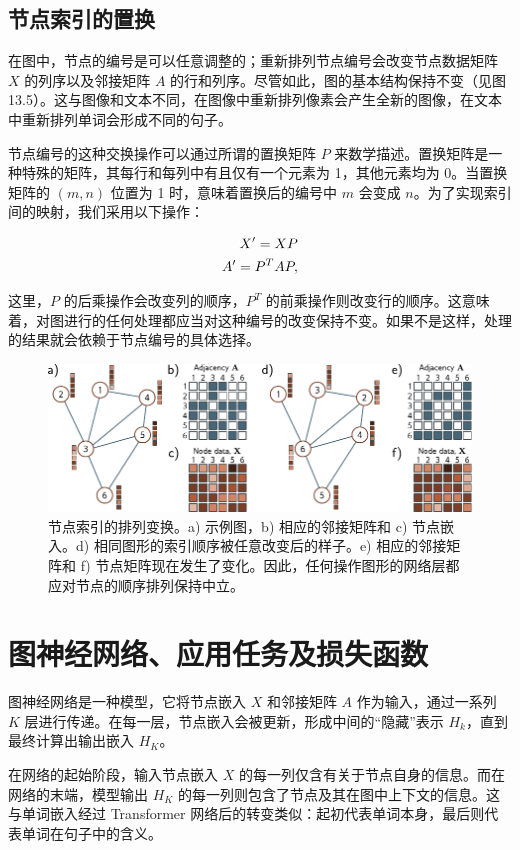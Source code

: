\documentclass[lang=cn,newtx,10pt,scheme=chinese]{elegantbook}
\begin{document}
\subsection{节点索引的置换}
在图中，节点的编号是可以任意调整的；重新排列节点编号会改变节点数据矩阵 \(X\) 的列序以及邻接矩阵 \(A\) 的行和列序。尽管如此，图的基本结构保持不变（见图 13.5）。这与图像和文本不同，在图像中重新排列像素会产生全新的图像，在文本中重新排列单词会形成不同的句子。

节点编号的这种交换操作可以通过所谓的置换矩阵 \(P\) 来数学描述。置换矩阵是一种特殊的矩阵，其每行和每列中有且仅有一个元素为 1，其他元素均为 0。当置换矩阵的 \((m, n)\) 位置为 1 时，意味着置换后的编号中 \(m\) 会变成 \(n\)。为了实现索引间的映射，我们采用以下操作：


\begin{align}
X' = XP \notag \\
A' = P^TAP, 
\end{align} 


这里，\(P\) 的后乘操作会改变列的顺序，\(P^T\) 的前乘操作则改变行的顺序。这意味着，对图进行的任何处理都应当对这种编号的改变保持不变。如果不是这样，处理的结果就会依赖于节点编号的具体选择。

\begin{figure}[ht!]
\centering
\includegraphics[width=0.7\linewidth]{PDFFigures/UDLChap13PDF/GraphNodeEquiv.pdf}
\caption{节点索引的排列变换。a) 示例图，b) 相应的邻接矩阵和 c) 节点嵌入。d) 相同图形的索引顺序被任意改变后的样子。e) 相应的邻接矩阵和 f) 节点矩阵现在发生了变化。因此，任何操作图形的网络层都应对节点的顺序排列保持中立。}
\end{figure}


\section{图神经网络、应用任务及损失函数}
图神经网络是一种模型，它将节点嵌入 \(X\) 和邻接矩阵 \(A\) 作为输入，通过一系列 \(K\) 层进行传递。在每一层，节点嵌入会被更新，形成中间的“隐藏”表示 \(H_k\)，直到最终计算出输出嵌入 \(H_K\)。

在网络的起始阶段，输入节点嵌入 \(X\) 的每一列仅含有关于节点自身的信息。而在网络的末端，模型输出 \(H_K\) 的每一列则包含了节点及其在图中上下文的信息。这与单词嵌入经过 Transformer 网络后的转变类似：起初代表单词本身，最后则代表单词在句子中的含义。
\end{document}
